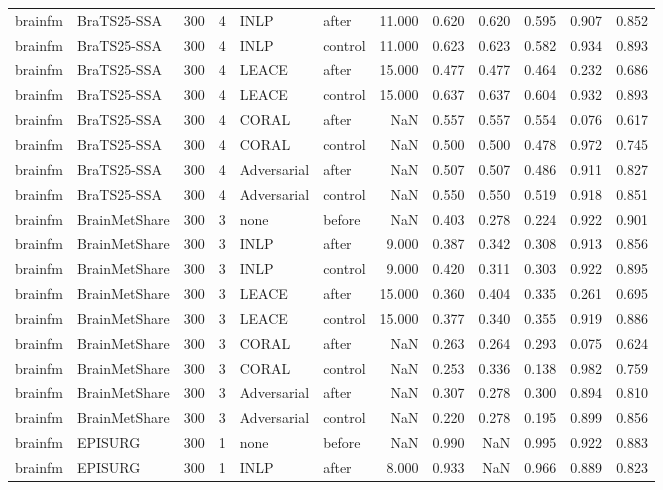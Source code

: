 \begin{tabular}{llrrllrrrrrr}
brainfm & BraTS25-SSA & 300 & 4 & INLP & after & 11.000 & 0.620 & 0.620 & 0.595 & 0.907 & 0.852 \\
brainfm & BraTS25-SSA & 300 & 4 & INLP & control & 11.000 & 0.623 & 0.623 & 0.582 & 0.934 & 0.893 \\
brainfm & BraTS25-SSA & 300 & 4 & LEACE & after & 15.000 & 0.477 & 0.477 & 0.464 & 0.232 & 0.686 \\
brainfm & BraTS25-SSA & 300 & 4 & LEACE & control & 15.000 & 0.637 & 0.637 & 0.604 & 0.932 & 0.893 \\
brainfm & BraTS25-SSA & 300 & 4 & CORAL & after & NaN & 0.557 & 0.557 & 0.554 & 0.076 & 0.617 \\
brainfm & BraTS25-SSA & 300 & 4 & CORAL & control & NaN & 0.500 & 0.500 & 0.478 & 0.972 & 0.745 \\
brainfm & BraTS25-SSA & 300 & 4 & Adversarial & after & NaN & 0.507 & 0.507 & 0.486 & 0.911 & 0.827 \\
brainfm & BraTS25-SSA & 300 & 4 & Adversarial & control & NaN & 0.550 & 0.550 & 0.519 & 0.918 & 0.851 \\
brainfm & BrainMetShare & 300 & 3 & none & before & NaN & 0.403 & 0.278 & 0.224 & 0.922 & 0.901 \\
brainfm & BrainMetShare & 300 & 3 & INLP & after & 9.000 & 0.387 & 0.342 & 0.308 & 0.913 & 0.856 \\
brainfm & BrainMetShare & 300 & 3 & INLP & control & 9.000 & 0.420 & 0.311 & 0.303 & 0.922 & 0.895 \\
brainfm & BrainMetShare & 300 & 3 & LEACE & after & 15.000 & 0.360 & 0.404 & 0.335 & 0.261 & 0.695 \\
brainfm & BrainMetShare & 300 & 3 & LEACE & control & 15.000 & 0.377 & 0.340 & 0.355 & 0.919 & 0.886 \\
brainfm & BrainMetShare & 300 & 3 & CORAL & after & NaN & 0.263 & 0.264 & 0.293 & 0.075 & 0.624 \\
brainfm & BrainMetShare & 300 & 3 & CORAL & control & NaN & 0.253 & 0.336 & 0.138 & 0.982 & 0.759 \\
brainfm & BrainMetShare & 300 & 3 & Adversarial & after & NaN & 0.307 & 0.278 & 0.300 & 0.894 & 0.810 \\
brainfm & BrainMetShare & 300 & 3 & Adversarial & control & NaN & 0.220 & 0.278 & 0.195 & 0.899 & 0.856 \\
brainfm & EPISURG & 300 & 1 & none & before & NaN & 0.990 & NaN & 0.995 & 0.922 & 0.883 \\
brainfm & EPISURG & 300 & 1 & INLP & after & 8.000 & 0.933 & NaN & 0.966 & 0.889 & 0.823 \\

\end{tabular}

